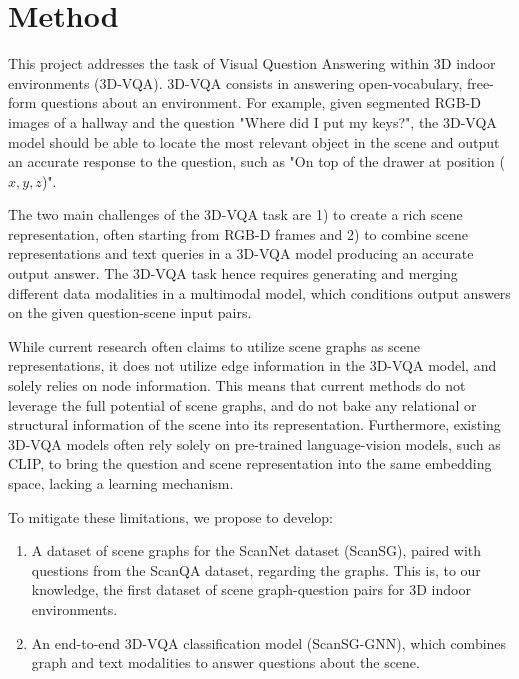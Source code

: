\newpage
\chapter{Method}

This project addresses the task of Visual Question Answering within 3D indoor environments (3D-VQA). 3D-VQA consists in answering open-vocabulary, free-form questions about an environment. For example, given segmented RGB-D images of a hallway and the question "Where did I put my keys?", the 3D-VQA model should be able to locate the most relevant object in the scene and output an accurate response to the question, such as "On top of the drawer at position ($x, y, z$)".

The two main challenges of the 3D-VQA task are 1) to create a rich scene representation, often starting from RGB-D frames and 2) to combine scene representations and text queries in a 3D-VQA model producing an accurate output answer. The 3D-VQA task hence requires generating and merging different data modalities in a multimodal model, which conditions output answers on the given question-scene input pairs.

While current research often claims to utilize scene graphs as scene representations, it does not utilize edge information in the 3D-VQA model, and solely relies on node information. This means that current methods do not leverage the full potential of scene graphs, and do not bake any relational or structural information of the scene into its representation. Furthermore, existing 3D-VQA models often rely solely on pre-trained language-vision models, such as CLIP, to bring the question and scene representation into the same embedding space, lacking a learning mechanism. 

To mitigate these limitations, we propose to develop:
\begin{enumerate}
    \item A dataset of scene graphs for the ScanNet dataset (ScanSG), paired with questions from the ScanQA dataset, regarding the graphs. This is, to our knowledge, the first dataset of scene graph-question pairs for 3D indoor environments.
    \item An end-to-end 3D-VQA classification model (ScanSG-GNN), which combines graph and text modalities to answer questions about the scene.
\end{enumerate}

